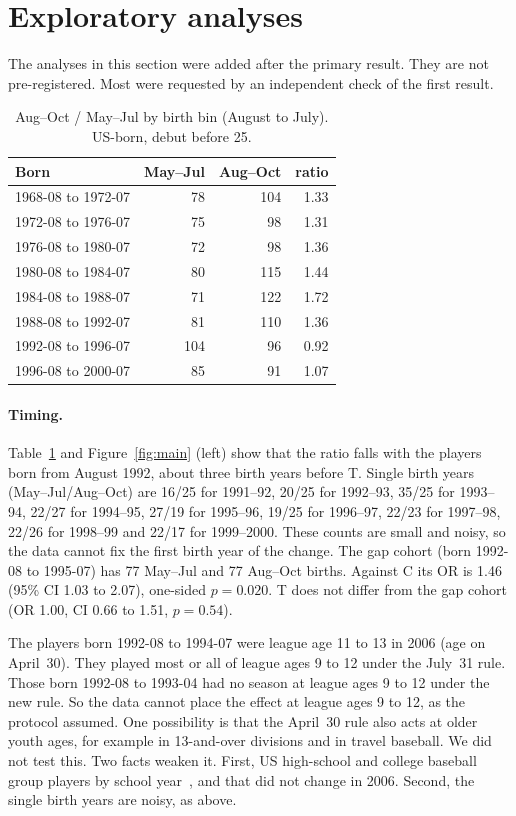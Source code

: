 \documentclass[11pt]{article}
\begin{document}
\section{Exploratory analyses}\label{sec:explore}

The analyses in this section were added after the primary result. They are not pre-registered. Most were requested by an independent check of the first result.

\begin{table}[ht]
\centering
\caption{Aug--Oct / May--Jul by birth bin (August to July). US-born, debut before 25.}
\label{tab:bins}
\begin{tabular}{lrrr}
\toprule
Born & May--Jul & Aug--Oct & ratio \\
\midrule
1968-08 to 1972-07 & 78 & 104 & 1.33 \\
1972-08 to 1976-07 & 75 & 98 & 1.31 \\
1976-08 to 1980-07 & 72 & 98 & 1.36 \\
1980-08 to 1984-07 & 80 & 115 & 1.44 \\
1984-08 to 1988-07 & 71 & 122 & 1.72 \\
1988-08 to 1992-07 & 81 & 110 & 1.36 \\
1992-08 to 1996-07 & 104 & 96 & 0.92 \\
1996-08 to 2000-07 & 85 & 91 & 1.07 \\
\bottomrule
\end{tabular}
\end{table}

\paragraph{Timing.} Table~\ref{tab:bins} and Figure~\ref{fig:main} (left) show that the ratio falls with the players born from August 1992, about three birth years before T. Single birth years (May--Jul/Aug--Oct) are 16/25 for 1991--92, 20/25 for 1992--93, 35/25 for 1993--94, 22/27 for 1994--95, 27/19 for 1995--96, 19/25 for 1996--97, 22/23 for 1997--98, 22/26 for 1998--99 and 22/17 for 1999--2000. These counts are small and noisy, so the data cannot fix the first birth year of the change. The gap cohort (born 1992-08 to 1995-07) has 77 May--Jul and 77 Aug--Oct births. Against C its OR is 1.46 (95\% CI 1.03 to 2.07), one-sided $p = 0.020$. T does not differ from the gap cohort (OR 1.00, CI 0.66 to 1.51, $p = 0.54$).

The players born 1992-08 to 1994-07 were league age 11 to 13 in 2006 (age on April~30). They played most or all of league ages 9 to 12 under the July~31 rule. Those born 1992-08 to 1993-04 had no season at league ages 9 to 12 under the new rule. So the data cannot place the effect at league ages 9 to 12, as the protocol assumed. One possibility is that the April~30 rule also acts at older youth ages, for example in 13-and-over divisions and in travel baseball. We did not test this. Two facts weaken it. First, US high-school and college baseball group players by school year~\cite{jedlovec2009}, and that did not change in 2006. Second, the single birth years are noisy, as above.
\end{document}
